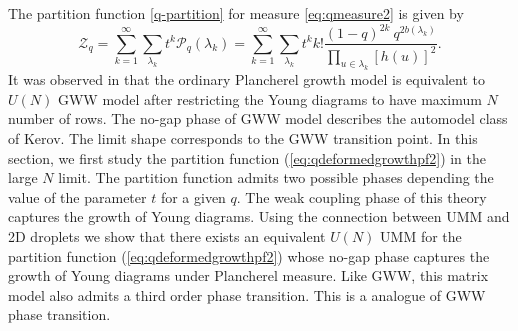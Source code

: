 \documentclass[3p,12pt]{elsarticle}
\numberwithin{equation}{section}
\begin{document}
The partition function \eqref{q-partition} for measure \eqref{eq:qmeasure2} is given by
%
\begin{equation}\label{eq:qdeformedgrowthpf2}
	\mathcal{Z}_q=\sum_{k=1}^{\infty}\sum_{\lambda_k}t^k \mathcal{P}_q(\lambda_k)=\sum_{k=1}^{\infty}\sum_{\lambda_k}t^k k! \frac{(1-q)^{2k}\ q^{2b(\lambda_k)}}{\prod_{u \in \lambda_k} [h(u)]^2}.
\end{equation}
%
It was observed in \cite{Chattopadhyay:2019pkl} that the ordinary Plancherel growth model is equivalent to $U(N)$ GWW model after restricting the Young diagrams to have maximum $N$ number of rows. The no-gap phase of GWW model describes the automodel class of Kerov. The limit shape corresponds to the GWW transition point. In this section, we first study the partition function (\ref{eq:qdeformedgrowthpf2}) in the large $N$ limit. The partition function admits two possible phases depending the value of the parameter  $t$ for a given $q$. The weak coupling phase of this theory captures the \qd growth of Young diagrams. Using the connection between UMM and 2D droplets we show that there exists an equivalent $U(N)$ UMM for the partition function (\ref{eq:qdeformedgrowthpf2}) whose no-gap phase captures the growth of Young diagrams under \qd Plancherel measure. Like GWW, this matrix model also admits a third order phase transition. This is a \qd analogue of GWW phase transition.
\end{document}
